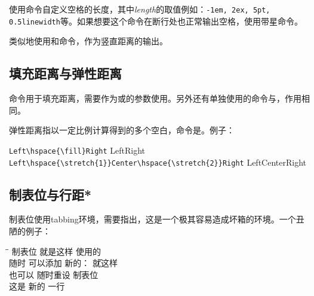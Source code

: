 使用\latexline{\\hspace{length}}命令自定义空格的长度，其中\textit{length}的取值例如：\texttt{-1em, 2ex, 5pt, 0.5linewidth}等。如果想要这个命令在断行处也正常输出空格，使用带星命令\latexline{\\hspace*}。

类似地使用\latexline{\\vspace}和\latexline{\\vspace*}命令，作为竖直距离的输出。

\subsection{填充距离与弹性距离}
命令\latexline{\\fill}用于填充距离，需要作为\latexline{\\hspace}或\latexline{\\vspace}的参数使用。另外还有单独使用的命令\latexline{\\hfill}与\latexline{\\vfill}，作用相同。

弹性距离指以一定比例计算得到的多个空白，命令是\latexline{\\stretch}。例子：

\begin{center}
\begin{boxedminipage}{0.9\linewidth}
\verb|Left\hspace{\fill}Right|
Left\hspace{\fill}Right
\verb|Left\hspace{\stretch{1}}Center\hspace{\stretch{2}}Right|
LeftCenterRight
\end{boxedminipage}
\end{center}

\subsection{制表位与行距*}
制表位使用tabbing环境，需要指出，这是一个极其容易造成坏箱的环境。一个丑陋的例子：
\begin{latex}{}
\begin{tabbing}
\hspace{4em}\=\hspace{8em}\=\kill
制表位 \> 就是这样 \> 使用的 \\
随时 \> 可以添加 \> 新的： \= 就这样 \\
也可以 \= 随时重设 \= 制表位 \\
这是 \> 新的 \> 一行
\end{tabbing}
\end{latex}

